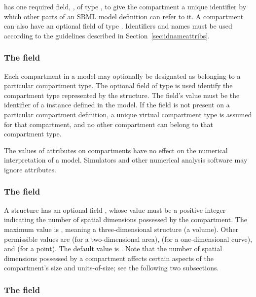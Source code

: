 \Compartment has one required field, , of type
, to give the compartment a unique identifier by
which other parts of an SBML model definition can refer to it.  A
compartment can also have an optional  field of type
.  Identifiers and names must be used according
to the guidelines described in Section~\ref{sec:idnameattribs}.


\subsubsection{The  field}
\label{sec:compartment-compartment-type}

Each compartment in a model may optionally be designated as
belonging to a particular compartment type.  The optional field
 of type  is used identify
the compartment type represented by the \Compartment structure.
The  field's value must be the identifier
of a \CompartmentType instance defined in the model.  If the
 field is not present on a particular
compartment definition, a unique virtual compartment type is
assumed for that compartment, and no other compartment can belong
to that compartment type.

The values of  attributes on compartments
have no effect on the numerical interpretation of a model.
Simulators and other numerical analysis software may ignore
 attributes.


\subsubsection{The  field}

A \Compartment structure has an optional field
, whose value must be a positive integer
indicating the number of spatial dimensions possessed by the
compartment.  The maximum value is , meaning a
three-dimensional structure (a volume).  Other permissible values
are  (for a two-dimensional area),  (for a
one-dimensional curve), and  (for a point).  The default
value is . Note that the number of spatial dimensions
possessed by a compartment affects certain aspects of the
compartment's size and units-of-size; see the following two
subsections.


\subsubsection{The  field}
\label{sec:size}

